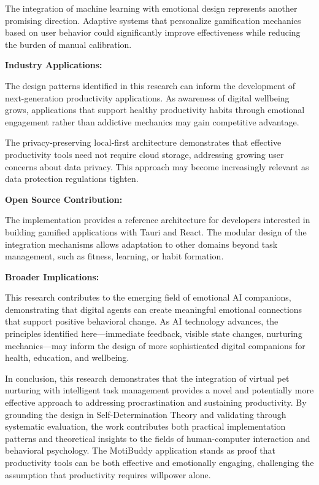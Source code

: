 The integration of machine learning with emotional design represents another promising direction. Adaptive systems that personalize gamification mechanics based on user behavior could significantly improve effectiveness while reducing the burden of manual calibration.

\textbf{Industry Applications:}

The design patterns identified in this research can inform the development of next-generation productivity applications. As awareness of digital wellbeing grows, applications that support healthy productivity habits through emotional engagement rather than addictive mechanics may gain competitive advantage.

The privacy-preserving local-first architecture demonstrates that effective productivity tools need not require cloud storage, addressing growing user concerns about data privacy. This approach may become increasingly relevant as data protection regulations tighten.

\textbf{Open Source Contribution:}

The implementation provides a reference architecture for developers interested in building gamified applications with Tauri and React. The modular design of the integration mechanisms allows adaptation to other domains beyond task management, such as fitness, learning, or habit formation.

\textbf{Broader Implications:}

This research contributes to the emerging field of emotional AI companions, demonstrating that digital agents can create meaningful emotional connections that support positive behavioral change. As AI technology advances, the principles identified here---immediate feedback, visible state changes, nurturing mechanics---may inform the design of more sophisticated digital companions for health, education, and wellbeing.

\vspace{1cm}

In conclusion, this research demonstrates that the integration of virtual pet nurturing with intelligent task management provides a novel and potentially more effective approach to addressing procrastination and sustaining productivity. By grounding the design in Self-Determination Theory and validating through systematic evaluation, the work contributes both practical implementation patterns and theoretical insights to the fields of human-computer interaction and behavioral psychology. The MotiBuddy application stands as proof that productivity tools can be both effective and emotionally engaging, challenging the assumption that productivity requires willpower alone.

